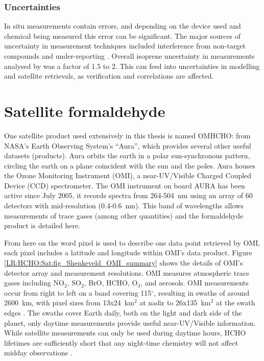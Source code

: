     \subsubsection{Uncertainties}
    \label{Model:datasets:uncertainties}
      
      In situ measurements contain errors, and depending on the device used and chemical being measured this error can be significant.
      The major sources of uncertainty in measurement techniques included interference from non-target compounds and under-reporting \parencite[e.g.,][]{Dunne2018,Guerette2018}.
      Overall isoprene uncertainty in measurements analysed by \textcite{Dunne2018} was a factor of 1.5 to 2.
      This can feed into uncertainties in modelling and satellite retrievals, as verification and correlations are affected.

\section{Satellite formaldehyde}
\label{Model:omhcho}
  
  One satellite product used extensively in this thesis is named OMHCHO: from NASA's Earth Observing System's ``Aura'', which provides several other useful datasets (products).
  Aura orbits the earth in a polar sun-synchronous pattern, circling the earth on a plane coincident with the sun and the poles.
  Aura houses the Ozone Monitoring Instrument (OMI), a near-UV/Visible Charged Coupled Device (CCD) spectrometer.
  The OMI instrument on board AURA has been active since July 2005, it records spectra from 264-504~nm using an array of 60 detectors with mid-resolution (0.4-0.6~nm).
  This band of wavelengths allows measurements of trace gases (among other quantities) and the formaldehyde product is detailed here.
  
  
  From here on the word pixel is used to describe one data point retrieved by OMI, each pixel includes a latitude and longitude within OMI's data product.
  Figure \ref{LR:HCHO:Sat:fig_Shenkeveld_OMI_summary} shows the details of OMI's detector array and measurement resolutions.
  OMI measures atmospheric trace gases including NO$_2$, SO$_2$, BrO, HCHO, O$_3$, and aerosols.
  OMI measurements occur from right to left on a band covering 115$^{\circ}$, resulting in swaths of around 2600~km, with pixel sizes from 13x24~km$^2$ at nadir to 26x135~km$^2$ at the swath edges \parencite{Abad2015}.
  The swaths cover Earth daily, both on the light and dark side of the planet, only daytime measurements provide useful near-UV/Visible information.
  While satellite measurements can only be used during daytime hours, HCHO lifetimes are sufficiently short that any night-time chemistry will not affect midday observations \parencite{Wolfe2016}.
  
